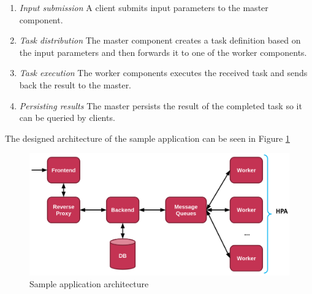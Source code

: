 
\begin{enumerate}
	\item \emph{Input submission} A client submits input parameters to the master component.
	\item \emph{Task distribution} The master component creates a task definition based on the input parameters and then forwards it to one of the worker components.
	\item \emph{Task execution} The worker components executes the received task and sends back the result to the master.
	\item \emph{Persisting results} The master persists the result of the completed task so it can be queried by clients.
\end{enumerate}

The designed architecture of the sample application can be seen in Figure \ref{fig:sample_app_arch}

\begin{figure}[h]
	\centering
	\includegraphics[width=130mm, keepaspectratio]{figures/sample_app_arch.png}
	\caption{Sample application architecture}
	\label{fig:sample_app_arch}
\end{figure}
%
%


